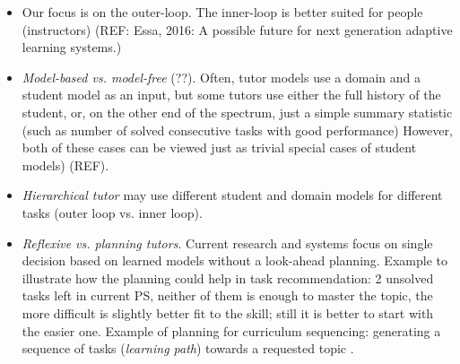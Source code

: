 \begin{itemize}
\item Our focus is on the outer-loop.
  The inner-loop is better suited for people (instructors)
  (REF: Essa, 2016: A possible future for next generation adaptive learning
  systems.)

\item \emph{Model-based vs. model-free} (??).  %
  Often, tutor models use a domain and a student model as an input, but some
  tutors use either the full history of the student, or, on the other end of
  the spectrum, just a simple summary statistic (such as number of solved
  consecutive tasks with good performance) However, both of these cases can be
  viewed just as trivial special cases of student models) (REF).

\item \emph{Hierarchical tutor} may use different student and domain models
  for different tasks (outer loop vs. inner loop).

\item \emph{Reflexive vs. planning tutors}.
Current research and systems focus on single decision based on learned models
without a look-ahead planning.  %
Example to illustrate how the planning could help in task recommendation:
2 unsolved tasks left in current PS, neither of them is enough to master the topic,
the more difficult is slightly better fit to the skill; still it is better to
start with the easier one.
Example of planning for curriculum sequencing: generating a sequence of tasks
(\emph{learning path}) towards a requested topic \cite{its-programming}.


\end{itemize}
